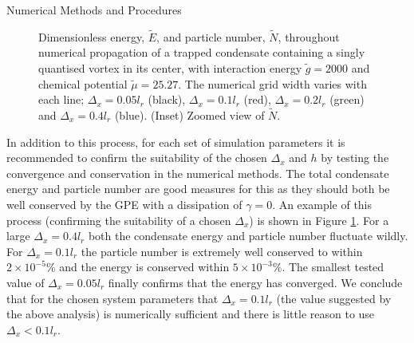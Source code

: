 \begin{chapter}{\label{cha:numerics}Numerical Methods and Procedures}
\begin{figure}
  \caption{Dimensionless energy, $\tilde{E}$, and particle number, $\tilde{N}$, throughout numerical propagation of a trapped condensate containing a singly quantised vortex in its center, with interaction energy $\tilde{g}=2000$ and chemical potential $\tilde{\mu}=25.27$. The numerical grid width varies with each line; $\Delta_x = 0.05l_r$ (black), $\Delta_x = 0.1l_r$ (red), $\Delta_x = 0.2l_r$ (green) and $\Delta_x = 0.4l_r$ (blue). (Inset) Zoomed view of $\tilde{N}$.}\label{fig_energ_norm_cons}
 \end{figure}

  In addition to this process, for each set of simulation parameters it is recommended to confirm the suitability of the chosen $\Delta_x$ and $h$ by testing the convergence and conservation in the numerical methods. The total condensate energy and particle number are good measures for this as they should both be well conserved by the GPE with a dissipation of $\gamma=0$. An example of this process (confirming the suitability of a chosen $\Delta_x$) is shown in Figure \ref{fig_energ_norm_cons}. For a large $\Delta_x=0.4l_r$ both the condensate energy and particle number fluctuate wildly. For $\Delta_x=0.1l_r$ the particle number is extremely well conserved to within $2\times 10^{-5}\%$ and the energy is conserved within $5\times 10^{-3}\%$. The smallest tested value of $\Delta_x=0.05l_r$ finally confirms that the energy has converged. We conclude that for the chosen system parameters that $\Delta_x=0.1l_r$ (the value suggested by the above analysis) is numerically sufficient and there is little reason to use $\Delta_x<0.1l_r$.


\end{chapter}
